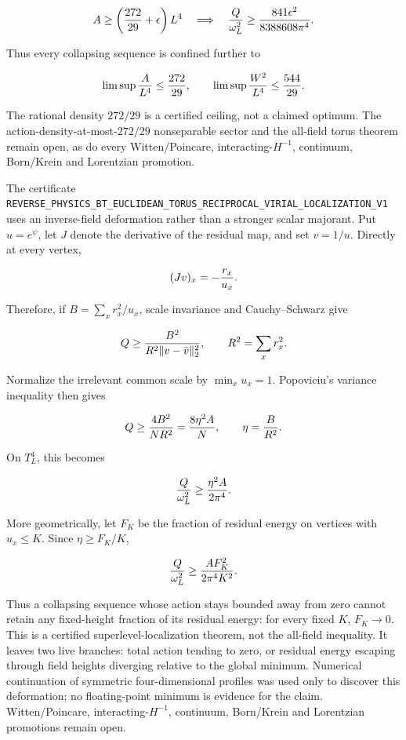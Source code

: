 \documentclass[11pt]{article}
\theoremstyle{definition}
\theoremstyle{remark}
\newcommand{\cert}[1]{\nolinkurl{#1}}
\begin{document}
\[
 A\geq\left({272\over29}+\epsilon\right)L^4
 \quad\Longrightarrow\quad
 {Q\over\omega_L^2}\geq
 {841\epsilon^2\over8388608\pi^4}.
\]

Thus every collapsing sequence is confined further to

\[
 \limsup {A\over L^4}\leq{272\over29},
 \qquad
 \limsup {W^2\over L^4}\leq{544\over29}.
\]

The rational density \(272/29\) is a certified ceiling, not a claimed
optimum.  The action-density-at-most-\(272/29\) nonseparable sector and the
all-field torus theorem remain open, as do every Witten/Poincare,
interacting-\(H^{-1}\), continuum, Born/Krein and Lorentzian promotion.

The certificate
\cert{REVERSE_PHYSICS_BT_EUCLIDEAN_TORUS_RECIPROCAL_VIRIAL_LOCALIZATION_V1}
uses an inverse-field deformation rather than a stronger scalar majorant.
Put \(u=e^\psi\), let \(J\) denote the derivative
of the residual map, and set \(v=1/u\).  Directly at every vertex,

\[
 (Jv)_x=-{r_x\over u_x}.
\]

Therefore, if \(B=\sum_xr_x^2/u_x\), scale invariance and
Cauchy--Schwarz give

\[
 Q\geq {B^2\over R^2\lVert v-\bar v\rVert_2^2},
 \qquad R^2=\sum_xr_x^2.
\]

Normalize the irrelevant common scale by \(\min_xu_x=1\).  Popoviciu's
variance inequality then gives

\[
 Q\geq{4B^2\over NR^2}={8\eta^2A\over N},
 \qquad \eta={B\over R^2}.
\]

On \(T_L^4\), this becomes

\[
 {Q\over\omega_L^2}\geq{\eta^2A\over2\pi^4}.
\]

More geometrically, let \(F_K\) be the fraction of residual energy on
vertices with \(u_x\leq K\).  Since \(\eta\geq F_K/K\),

\[
 {Q\over\omega_L^2}\geq {A F_K^2\over2\pi^4K^2}.
\]

Thus a collapsing sequence whose action stays bounded away from zero cannot
retain any fixed-height fraction of its residual energy: for every fixed
\(K\), \(F_K\to0\).  This is a certified superlevel-localization theorem,
not the all-field inequality.  It leaves two live branches: total action
tending to zero, or residual energy escaping through field heights diverging
relative to the global minimum.  Numerical continuation of symmetric
four-dimensional profiles was used only to discover this deformation; no
floating-point minimum is evidence for the claim.  Witten/Poincare,
interacting-\(H^{-1}\), continuum, Born/Krein and Lorentzian promotions remain
open.
\end{document}
